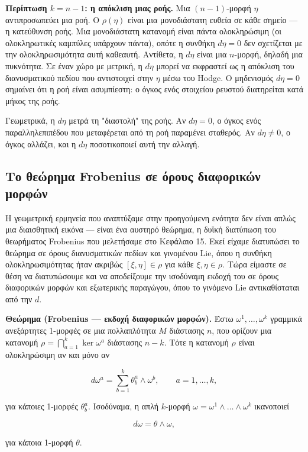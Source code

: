 \documentclass[12pt]{article}
\begin{document}
\textbf{Περίπτωση $k=n-1$: η απόκλιση μιας ροής.} Μια $(n-1)$-μορφή $\eta$ αντιπροσωπεύει μια ροή. Ο $\rho(\eta)$ είναι μια μονοδιάστατη ευθεία σε κάθε σημείο — η κατεύθυνση ροής. Μια μονοδιάστατη κατανομή είναι πάντα ολοκληρώσιμη (οι ολοκληρωτικές καμπύλες υπάρχουν πάντα), οπότε η συνθήκη $d\eta = 0$ δεν σχετίζεται με την ολοκληρωσιμότητα αυτή καθεαυτή. Αντίθετα, η $d\eta$ είναι μια $n$-μορφή, δηλαδή μια πυκνότητα. Σε έναν χώρο με μετρική, η $d\eta$ μπορεί να εκφραστεί ως η απόκλιση του διανυσματικού πεδίου που αντιστοιχεί στην $\eta$ μέσω του Hodge. Ο μηδενισμός $d\eta = 0$ σημαίνει ότι η ροή είναι ασυμπίεστη: ο όγκος ενός στοιχείου ρευστού διατηρείται κατά μήκος της ροής.

Γεωμετρικά, η $d\eta$ μετρά τη "διαστολή" της ροής. Αν $d\eta = 0$, ο όγκος ενός παραλληλεπιπέδου που μεταφέρεται από τη ροή παραμένει σταθερός. Αν $d\eta \neq 0$, ο όγκος αλλάζει, και η $d\eta$ ποσοτικοποιεί αυτή την αλλαγή.

\subsection{Το θεώρημα Frobenius σε όρους διαφορικών μορφών}

Η γεωμετρική ερμηνεία που αναπτύξαμε στην προηγούμενη ενότητα δεν είναι απλώς μια διαισθητική εικόνα — είναι ένα αυστηρό θεώρημα, η δυϊκή διατύπωση του θεωρήματος Frobenius που μελετήσαμε στο Κεφάλαιο 15. Εκεί είχαμε διατυπώσει το θεώρημα σε όρους διανυσματικών πεδίων και γινομένου Lie, όπου η συνθήκη ολοκληρωσιμότητας ήταν ακριβώς $[\xi, \eta] \in \rho$ για κάθε $\xi, \eta \in \rho$. Τώρα είμαστε σε θέση να διατυπώσουμε και να αποδείξουμε την ισοδύναμη εκδοχή του σε όρους διαφορικών μορφών και εξωτερικής παραγώγου, όπου το γινόμενο Lie αντικαθίσταται από την $d$.

\textbf{Θεώρημα (Frobenius — εκδοχή διαφορικών μορφών).} Έστω $\omega^1, \dots, \omega^k$ γραμμικά ανεξάρτητες 1-μορφές σε μια πολλαπλότητα $M$ διάστασης $n$, που ορίζουν μια κατανομή $\rho = \bigcap_{a=1}^k \ker \omega^a$ διάστασης $n-k$. Τότε η κατανομή $\rho$ είναι ολοκληρώσιμη αν και μόνο αν

\[
d\omega^a = \sum_{b=1}^{k} \theta^a_b \wedge \omega^b, \qquad a = 1, \dots, k,
\]

για κάποιες 1-μορφές $\theta^a_b$. Ισοδύναμα, η απλή $k$-μορφή $\omega = \omega^1 \wedge \dots \wedge \omega^k$ ικανοποιεί

\[
d\omega = \theta \wedge \omega,
\]

για κάποια 1-μορφή $\theta$.
\end{document}
